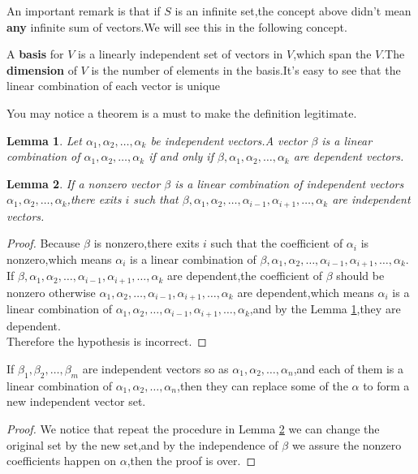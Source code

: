 \documentclass{article}
\begin{document}
An important remark is that if $S$ is an infinite set,the concept above didn't mean \textbf{any} infinite sum of vectors.We will see this in the following concept.
\begin{dde}
	A \textbf{basis} for $V$ is a linearly independent set of vectors in $V$,which span the $V$.The \textbf{dimension} of $V$ is the number of elements in the basis.It's easy to see that the linear combination of each vector is unique
\end{dde}
You may notice a theorem is a must to make the definition legitimate.
\theoremstyle{plain}\newtheorem{lem}{Lemma}[section]
\begin{lem}\label{lemma1}
	Let $\alpha_1,\alpha_2,\dots,\alpha_k$ be independent vectors.A vector $\beta$ is a linear combination of $\alpha_1,\alpha_2,\dots,\alpha_k$ if and only if $\beta,\alpha_1,\alpha_2,\dots,\alpha_k$ are dependent vectors.
\end{lem}
\begin{lem}\label{lemma2}
	If a nonzero vector $\beta$ is a linear combination of independent vectors $\alpha_1,\alpha_2,\dots,\alpha_k$,there exits $i$ such that $\beta,\alpha_1,\alpha_2,\dots,\alpha_{i-1},\alpha_{i+1},\dots,\alpha_k$ are independent vectors.
\end{lem}
\begin{proof}
	Because $\beta$ is nonzero,there exits $i$ such that the coefficient of $\alpha_i$ is nonzero,which means $\alpha_i$ is a linear combination of $\beta,\alpha_1,\alpha_2,\dots,\alpha_{i-1},\alpha_{i+1},\dots,\alpha_k$.\\
	If $\beta,\alpha_1,\alpha_2,\dots,\alpha_{i-1},\alpha_{i+1},\dots,\alpha_k$ are dependent,the coefficient of $\beta$ should be nonzero otherwise $\alpha_1,\alpha_2,\dots,\alpha_{i-1},\alpha_{i+1},\dots,\alpha_k$ are dependent,which means $\alpha_i$ is a linear combination of $\alpha_1,\alpha_2,\dots,\alpha_{i-1},\alpha_{i+1},\dots,\alpha_k$,and by the Lemma \ref{lemma1},they are dependent.\\Therefore the hypothesis is incorrect.
\end{proof}
\begin{thm}\label{repthm}
	If $\beta_1,\beta_2,\dots,\beta_m$ are independent vectors so as $\alpha_1,\alpha_2,\dots,\alpha_n$,and each of them is a linear combination of $\alpha_1,\alpha_2,\dots,\alpha_n$,then they can replace some of the $\alpha$ to form a new independent vector set.
\end{thm}
\begin{proof}
	We notice that repeat the procedure in Lemma \ref{lemma2} we can change the original set by the new set,and by the independence of $\beta$ we assure the nonzero coefficients happen on $\alpha$,then the proof is over.
\end{proof}
\end{document}
